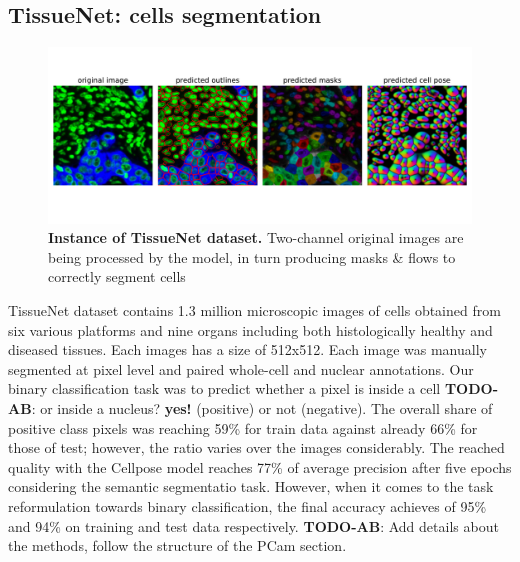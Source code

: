 \documentclass{article}
\newcommand{\todo}[2]{{\color{red} {\bf TODO-#1}: #2}}
\begin{document}
\subsection{TissueNet: cells segmentation}

\begin{figure}
	\advance\leftskip-0.5cm
	\includegraphics[width=8in]{img/tissuenet.pdf}
	\caption{{\bf Instance of TissueNet dataset.} Two-channel original images are being processed by the model, in turn producing masks \& flows to correctly segment cells}
	\label{fig:tissue_example}
\end{figure} 

TissueNet dataset contains 1.3 million microscopic images of cells obtained from six various platforms and nine organs including both histologically healthy and diseased tissues. Each images has a size of 512x512. Each image was manually segmented at pixel level and paired whole-cell and nuclear annotations. Our binary classification task was to predict whether a pixel is inside a cell \todo{AB}{or inside a nucleus?} {\bf yes!} (positive) or not (negative). The overall share of positive class pixels was reaching 59\% for train data against already 66\% for those of test; however, the ratio varies over the images considerably. The reached quality with the Cellpose model \cite{cellpose} reaches 77\%  of average precision after five epochs considering the semantic segmentatio task. However, when it comes to the task reformulation towards binary classification, the final accuracy achieves of 95\% and 94\% on training and test data respectively.\todo{AB}{Add details about the methods, follow the structure of the PCam section.}
\end{document}
